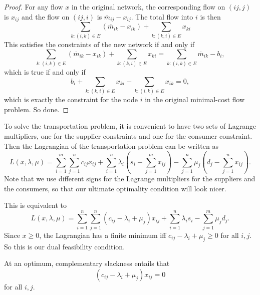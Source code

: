 \documentclass[a4paper]{article}
\begin{document}
\begin{proof}
  For any flow $x$ in the original network, the corresponding flow on $(ij, j)$ is $x_{ij}$ and the flow on $(ij, i)$ is $\overline{m}_{ij} - x_{ij}$. The total flow into $i$ is then
  \[
   \sum_{k: (i, k)\in E}(\overline{m}_{ik} - x_{ik}) + \sum_{k: (k, i)\in E}x_{ki}
  \]
  This satisfies the constraints of the new network if and only if
  \[
   \sum_{k: (i, k)\in E}(\overline{m}_{ik} - x_{ik}) + \sum_{k: (k, i)\in E}x_{ki} = \sum_{k: (i, k)\in E}\overline{m}_{ik} - b_i,
  \]
  which is true if and only if
  \[
    b_i + \sum_{k:(k, i)\in E}x_{ki} - \sum_{k: (i, k)\in E}x_{ik} = 0,
  \]
  which is exactly the constraint for the node $i$ in the original minimal-cost flow problem. So done.
\end{proof}
To solve the transportation problem, it is convenient to have two sets of Lagrange multipliers, one for the supplier constraints and one for the consumer constraint. Then the Lagrangian of the transportation problem can be written as
\[
  L(x, \lambda, \mu) = \sum_{i = 1}^m\sum_{j = 1}^n c_{ij}x_{ij} + \sum_{i = 1}^n \lambda_i\left(s_i - \sum_{j = 1}^m x_{ij}\right) - \sum_{j = 1}^n \mu_j\left(d_j - \sum_{j = 1}^n x_{ij}\right).
\]
Note that we use different signs for the Lagrange multipliers for the suppliers and the consumers, so that our ultimate optimality condition will look nicer.

This is equivalent to
\[
  L(x, \lambda, \mu) = \sum_{i = 1}^n \sum_{j = 1}^n (c_{ij} - \lambda_i + \mu_j)x_{ij} + \sum_{i = 1}^n \lambda_i s_i - \sum_{j = 1}^m \mu_j d_j.
\]
Since $x \geq 0$, the Lagrangian has a finite minimum iff $c_{ij} - \lambda_i + \mu_j \geq 0$ for all $i, j$. So this is our dual feasibility condition.

At an optimum, complementary slackness entails that
\[
  (c_{ij} - \lambda_i + \mu_j)x_{ij} = 0
\]
for all $i, j$.
\end{document}
